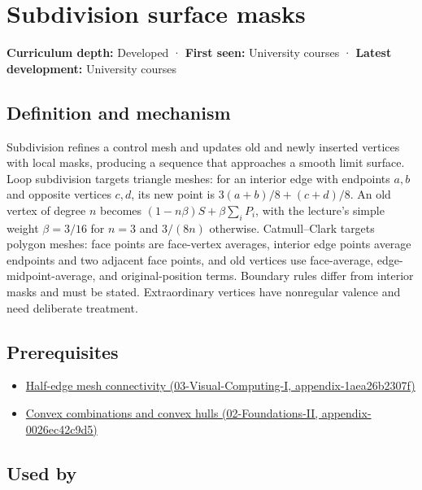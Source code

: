 \hypertarget{appendix-0234ab7f86b1}{}
\section{Subdivision surface masks}\label{appendix-0234ab7f86b1-subdivision-surface-masks}

\textbf{Curriculum depth:} Developed · \textbf{First seen:} University courses · \textbf{Latest development:} University courses

\subsection{Definition and mechanism}\label{appendix-0234ab7f86b1-definition-and-mechanism}

Subdivision refines a control mesh and updates old and newly inserted vertices with local masks, producing a sequence that approaches a smooth limit surface. Loop subdivision targets triangle meshes: for an interior edge with endpoints \(a,b\) and opposite vertices \(c,d\), its new point is \(3(a+b)/8+(c+d)/8\). An old vertex of degree \(n\) becomes \((1-n\beta)S+\beta\sum_iP_i\), with the lecture's simple weight \(\beta=3/16\) for \(n=3\) and \(3/(8n)\) otherwise. Catmull--Clark targets polygon meshes: face points are face-vertex averages, interior edge points average endpoints and two adjacent face points, and old vertices use face-average, edge-midpoint-average, and original-position terms. Boundary rules differ from interior masks and must be stated. Extraordinary vertices have nonregular valence and need deliberate treatment.

\subsection{Prerequisites}\label{appendix-0234ab7f86b1-prerequisites}

\begin{itemize}
\tightlist
\item
  \href{../03-Visual-Computing-I/main.pdf\#nameddest=appendix-1aea26b2307f}{Half-edge mesh connectivity (03-Visual-Computing-I, appendix-1aea26b2307f)}
\item
  \href{../02-Foundations-II/main.pdf\#nameddest=appendix-0026ec42c9d5}{Convex combinations and convex hulls (02-Foundations-II, appendix-0026ec42c9d5)}
\end{itemize}

\subsection{Used by}\label{appendix-0234ab7f86b1-used-by}

